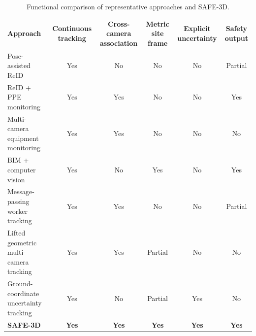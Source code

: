 \begin{table}[t]
\centering
\caption{Functional comparison of representative approaches and SAFE-3D.}
\label{tab:related_comparison}
\begin{tabular}{lccccc}
\toprule
Approach & Continuous tracking & Cross-camera association & Metric site frame & Explicit uncertainty & Safety output \\
\midrule
Pose-assisted ReID & Yes & No & No & No & Partial \\
ReID + PPE monitoring & Yes & Yes & No & No & Yes \\
Multi-camera equipment monitoring & Yes & Yes & No & No & No \\
BIM + computer vision & Yes & No & Yes & No & Yes \\
Message-passing worker tracking & Yes & Yes & No & No & Partial \\
Lifted geometric multi-camera tracking & Yes & Yes & Partial & No & No \\
Ground-coordinate uncertainty tracking & Yes & No & Partial & Yes & No \\
\textbf{SAFE-3D} & \textbf{Yes} & \textbf{Yes} & \textbf{Yes} & \textbf{Yes} & \textbf{Yes} \\
\bottomrule
\end{tabular}
\end{table}
